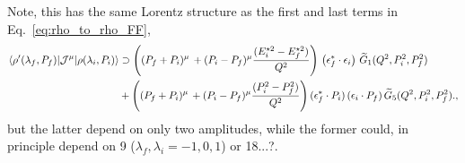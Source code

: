 Note, this has the same Lorentz structure as the first and last terms in Eq.~\ref{eq:rho_to_rho_FF},
\begin{align}
\langle\rho'(\lambda_f,P_f)|{\mathcal{J}}^{\mu}|\rho(\lambda_i,P_i)\rangle
&\supset
\left((P_f+P_i)^\mu \,+(P_i-P_f)^\mu\frac{(E_i^{\star 2}-E_f^{\star 2})}{Q^2} \right)\,\left(\epsilon_f^*\cdot \epsilon_i\right)\, \widetilde{G}_1(Q^2,P_i^2,P_f^2)\nonumber\\
&
+\left((P_f+P_i)^\mu \,+(P_i-P_f)^\mu\frac{(P_i^2-P_f^2)}{Q^2} \right)(\epsilon_f^*\cdot P_i)\,(\epsilon_i\cdot P_f)\,\widetilde{G}_5(Q^2,P_i^2,P_f^2).
,
\end{align}
but the latter depend on only two amplitudes, while the former could, in principle depend on 9 ($\lambda_f,\lambda_i=-1,0,1$) or 18...?. {\raul [need to sort this out...since $\mathcal{F}_{1;1 \lambda_i;1 \lambda_f}(Q^2;E_i^\star;E_f^\star)\,$ is a Lorentz scalar and the barrier factors..., can we write it as....????
\begin{align}
\mathcal{F}_{1;1 \lambda_i;1 \lambda_f}(Q^2;E_i^\star;E_f^\star)\, 
=
P_i\cdot P_f\widetilde{\mathcal{F}}_{1;1 \lambda_i;1 \lambda_f}(Q^2;E_i^\star;E_f^\star) \, .
\end{align}
]}


